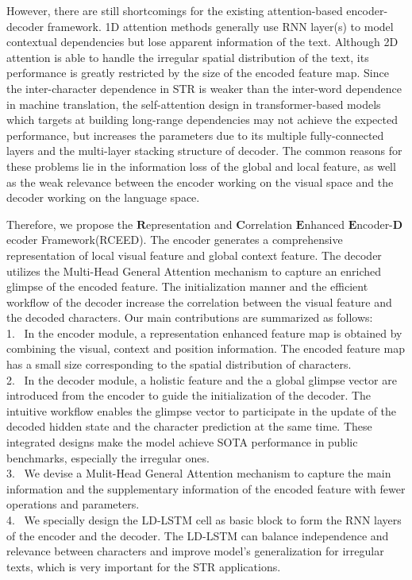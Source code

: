 \documentclass[runningheads]{llncs}
\begin{document}
However, there are still shortcomings for the existing attention-based encoder-decoder framework. 1D attention methods generally use RNN layer(s) to model contextual dependencies but lose apparent information of the text\cite{shi2018aster}. Although 2D attention is able to handle the irregular spatial distribution of the text, its performance is greatly restricted by the size of the encoded feature map\cite{li2019show}. Since the inter-character dependence in STR is weaker than the inter-word dependence in machine translation, the self-attention design in transformer-based models which targets at building long-range dependencies may not achieve the expected performance\cite{yang2020holistic}, but increases the parameters due to its multiple fully-connected layers and the multi-layer stacking structure of decoder. The common reasons for these problems lie in the information loss of the global and local feature, as well as the weak relevance between the encoder working on the visual space and the decoder working on the language space. 

Therefore, we propose the $\mathbf{R}$epresentation and $\mathbf{C}$orrelation $\mathbf{E}$nhanced $\mathbf{E}$ncoder-$\mathbf{D}$ecoder Framework(RCEED). The encoder generates a comprehensive representation of local visual feature and global context feature. The decoder utilizes the Multi-Head General Attention mechanism to capture an enriched glimpse of the encoded feature. The initialization manner and the efficient workflow of the decoder increase the correlation between the visual feature and the decoded characters.  
Our main contributions are summarized as follows:
\\ 1. \ In the encoder module, a representation enhanced feature map is obtained by combining the visual, context and position information. The encoded feature map has a small size corresponding to the spatial distribution of characters. 
\\ 2. \ In the decoder module, a holistic feature and the a global glimpse vector are introduced from the encoder to guide the initialization of the decoder. The intuitive workflow enables the glimpse vector to participate in the update of the decoded hidden state and the character prediction at the same time. These integrated designs make the model achieve SOTA performance in public benchmarks, especially the irregular ones.
\\ 3. \ We devise a Mulit-Head General Attention mechanism to capture the main information and the supplementary information of the encoded feature with fewer operations and parameters.
\\ 4. \  We specially design the LD-LSTM cell as basic block to form the RNN layers of the encoder and the decoder. The LD-LSTM can balance independence and relevance between characters and improve model's generalization for irregular texts, which is very important for the STR applications. 
\end{document}
